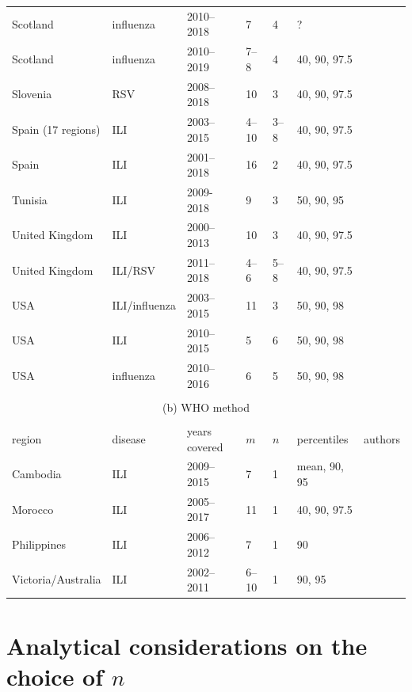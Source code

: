 \documentclass{article}
\begin{document}
\begin{table}[h!]
\begin{tabular}{l l l l l l l}
Scotland & influenza & 2010--2018 & 7 & 4 & ? & \cite{Murray2018}\\
Scotland & influenza & 2010--2019 & 7--8 & 4 & 40, 90, 97.5 & \cite{Dickson2020}\\
Slovenia & RSV & 2008--2018 & 10 & 3 & 40, 90, 97.5 & \cite{Grilc2020}\\
Spain (17 regions) & ILI & 2003--2015 & 4--10 & 3--8 & 40, 90, 97.5 & \cite{Bangert2017}\\
Spain & ILI & 2001--2018 & 16 & 2 & 40, 90, 97.5 & \cite{RedondoBravo2020}\\
Tunisia & ILI & 2009-2018 & 9 & 3 & 50, 90, 95 & \cite{Bouguerra2020}\\
United Kingdom & ILI & 2000--2013 & 10 & 3 & 40, 90, 97.5 & \cite{Green2015}\\
United Kingdom & ILI/RSV & 2011--2018 & 4--6 & 5--8 & 40, 90, 97.5 & \cite{Harcourt2019}\\
USA & ILI/influenza & 2003--2015 & 11 & 3 & 50, 90, 98 & \cite{Biggerstaff2017}\\
USA & ILI & 2010--2015 & 5 & 6 & 50, 90, 98 & \cite{Dahlgren2018}\\
USA & influenza & 2010--2016 & 6 & 5 & 50, 90, 98 & \cite{Dahlgren2019}\\
\bottomrule\\
\multicolumn{7}{c}{(b) WHO method}\\ \\
\toprule
region & disease & years covered & $m$ & $n$ & percentiles & authors\\
\midrule
Cambodia & ILI & 2009--2015 & 7 & 1 & mean, 90, 95 & \cite{Ly2017}\\
Morocco & ILI & 2005--2017 & 11 & 1 & 40, 90, 97.5 & \cite{Rguig2020}\\
Philippines & ILI & 2006--2012 & 7 & 1 & 90 & \cite{Lucero2016}\\
Victoria/Australia & ILI & 2002--2011 & 6--10 & 1 & 90, 95 & \cite{Tay2013}\\
\end{tabular}
\end{table}


\section{Analytical considerations on the choice of $n$}
\label{sec:analytical}
\end{document}
